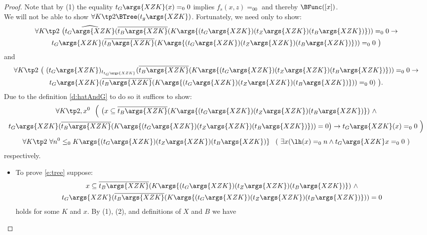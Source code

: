 \begin{proof}
Note that by (1) the equality $t_G\args{XZK}(x)=_00$ implies $f_s(x,z)=_00$ and thereby
 $\BFunc([x])$.\\
We will not be able to show $\forall K\tp2\BTree(t_g\args{XZK})$. Fortunately, we need only
to show:
\begin{multline*}
\forall K\tp2\ {\big(} 
\widehat{t_G\args{XZK}}
 (\overline{t_B\args{XZK}}(K\args{ (t_G\args{XZK}) (t_Z\args{XZK}) (t_B\args{XZK}) }))=_00 
       \rightarrow\\
 t_G\args{XZK}
   (\overline{t_B\args{XZK}}(K\args{ (t_G\args{XZK}) (t_Z\args{XZK}) (t_B\args{XZK}) }))=_00\ 
{\big)} 
\end{multline*}
and
\begin{multline*}
\forall K\tp2\ {\big(}\ (t_G\args{XZK})_{t_{t_G\args{XZK}}}(\overline{t_B\args{XZK}}(K\args{ (t_G\args{XZK}) (t_Z\args{XZK}) (t_B\args{XZK}) }))=_00 \rightarrow\\
                           t_G\args{XZK}(\overline{t_B\args{XZK}}(K\args{ (t_G\args{XZK}) (t_Z\args{XZK}) (t_B\args{XZK}) }))=_00)\ {\big)}\text{.}
\end{multline*}
Due to the definition \ref{d:hatAndG} to do so it suffices to show:
\begin{multline}
\forall K\tp2,x^0 
\ \ {\Big(\ }{\big(} x\subseteq 
       \overline{t_B\args{XZK}}(K\args{ (t_G\args{XZK}) (t_Z\args{XZK}) (t_B\args{XZK}) } ) 
      \ \wedge \\
      t_G\args{XZK}
       (\overline{t_B\args{XZK}}(K\args{ (t_G\args{XZK}) (t_Z\args{XZK}) (t_B\args{XZK}) } ))=0
    {\big)}
    \rightarrow 
                           t_G\args{XZK}(x)=_00 {\ \Big)} \label{e:tree}
\end{multline}
\begin{align}
\forall K\tp2\ 
  \forall n^0 \leq_0 K\args{ (t_G\args{XZK}) (t_Z\args{XZK}) (t_B\args{XZK}) }\ \ 
\left(\ \exists x (\lh(x)=_0 n \wedge t_G\args{XZK}x=_00\ \right) \label{e:inf}
\end{align}
respectively.
\begin{itemize}
\item To prove \eqref{e:tree} suppose:
\begin{multline}\label{e:trAss}
x\subseteq 
       \overline{t_B\args{XZK}}(K\args{ (t_G\args{XZK}) (t_Z\args{XZK}) (t_B\args{XZK}) } ) 
      \ \wedge \\
      t_G\args{XZK}
       (\overline{t_B\args{XZK}}(K\args{ (t_G\args{XZK}) (t_Z\args{XZK}) (t_B\args{XZK}) } ))=0
\end{multline}
holds for some $K$ and $x$. By (1), (2), and definitions of $X$ and $B$ we have

\end{itemize}
\end{proof}
